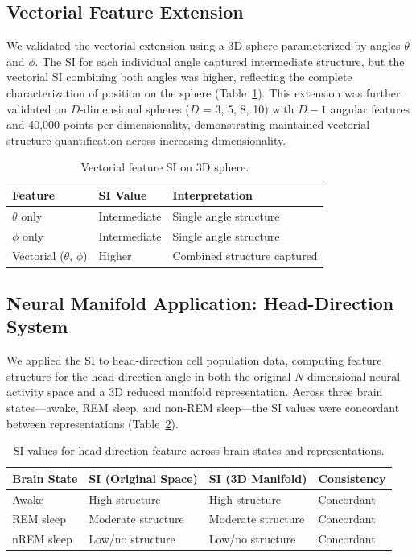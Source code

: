 \documentclass[12pt]{article}
\begin{document}
\subsection{Vectorial Feature Extension}

We validated the vectorial extension using a 3D sphere parameterized by angles $\theta$ and $\phi$. The SI for each individual angle captured intermediate structure, but the vectorial SI combining both angles was higher, reflecting the complete characterization of position on the sphere (Table~\ref{tab:vectorial}). This extension was further validated on $D$-dimensional spheres ($D$ = 3, 5, 8, 10) with $D-1$ angular features and 40,000 points per dimensionality, demonstrating maintained vectorial structure quantification across increasing dimensionality.

\begin{table}[htbp]
\centering
\caption{Vectorial feature SI on 3D sphere.}
\label{tab:vectorial}
\begin{tabular}{lll}
\toprule
Feature & SI Value & Interpretation \\
\midrule
$\theta$ only & Intermediate & Single angle structure \\
$\phi$ only & Intermediate & Single angle structure \\
Vectorial ($\theta$, $\phi$) & Higher & Combined structure captured \\
\bottomrule
\end{tabular}
\end{table}

\subsection{Neural Manifold Application: Head-Direction System}

We applied the SI to head-direction cell population data, computing feature structure for the head-direction angle in both the original $N$-dimensional neural activity space and a 3D reduced manifold representation. Across three brain states---awake, REM sleep, and non-REM sleep---the SI values were concordant between representations (Table~\ref{tab:neural}).

\begin{table}[htbp]
\centering
\caption{SI values for head-direction feature across brain states and representations.}
\label{tab:neural}
\begin{tabular}{llll}
\toprule
Brain State & SI (Original Space) & SI (3D Manifold) & Consistency \\
\midrule
Awake & High structure & High structure & Concordant \\
REM sleep & Moderate structure & Moderate structure & Concordant \\
nREM sleep & Low/no structure & Low/no structure & Concordant \\
\bottomrule
\end{tabular}
\end{table}
\end{document}
